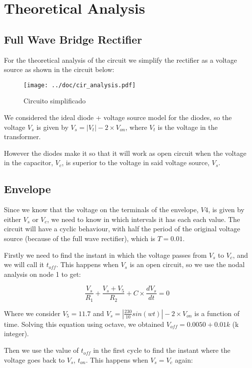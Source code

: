 \section{Theoretical Analysis}
\label{sec:analysis}

\subsection{Full Wave Bridge Rectifier}
For the theoretical analysis of the circuit we simplify the rectifier as a voltage source as shown in the circuit below:

\begin{figure}[H] \centering
\texttt{[image: ../doc/cir\_analysis.pdf]}
\caption{Circuito simplificado}
\label{fig:cir_simples}
\end{figure}

We considered the ideal diode + voltage source model for the diodes, so the voltage $V_s$ is given by $V_s= |V_t|-2\times V_{on}$, where $V_t$ is the voltage in the transformer.
\par
However the diodes make it so that it will work as open circuit when the voltage in the capacitor, $V_c$, is superior to the voltage in said voltage source, $V_s$.

\subsection{Envelope}
Since we know that the voltage on the terminals of the envelope, $V4$, is given by either $V_s$ or $V_c$, we need to know in which intervals it has each each value. The circuit will have a cyclic behaviour, with half the period of the original voltage source (because of the full wave rectifier), which is $T=0.01$.
\par
Firstly we need to find the instant in which the voltage passes from $V_s$ to $V_c$, and we will call it $t_{off}$. This happens when $V_s$ is an open circuit, so we use the nodal analysis on node 1 to get:

\begin{equation}\label{eq:t_off}
\frac{V_s}{R_1}+\frac{V_s+V_5}{R_2}+C\times\frac{dV_s}{dt}=0
\end{equation}

Where we consider $V_5=11.7$ and $V_s=|\frac{230}{10} sin(wt)|-2\times V_{on}$ is a function of time. Solving this equation using octave, we obtained $V_{off}=0.0050 + 0.01k$ (k integer).
\par
Then we use the value of $t_{off}$ in the first cycle to find the instant where the voltage goes back to $V_s$, $t_{on}$. This happens when $V_s=V_c$ again:

